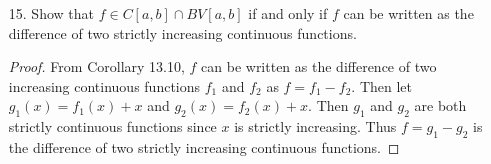 \documentclass{article}
\begin{document}
\begin{itemize}
\begin{proof}
			We have equality
			\begin{align*}
				\abs{\sum_{n=1}^{\infty} c_n\bigg[I(y_i-x_n)-I(y_{i-1}-x_n)\bigg]} = \sum_{n=1}^{\infty} \abs{c_n\bigg[I(y_i-x_n)-I(y_{i-1}-x_n)\bigg]}
			\end{align*}
			if and only if all of the $c_n\bigg[I(y_i-x_n)-I(y_{i-1}-x_n)\bigg]$ have the same sign, which can happen if
			\begin{align*}
				I(y_i-x_n)-I(y_{i-1}-x_n)=\begin{cases}
					0 &\text{if }c_n<0 \\
					1 &\text{if }c_n\ge 0
				\end{cases}
			\end{align*}
			This construction is relatively easy to do, and produces equality of $V(f, P)=\sum_{n=1}^{\infty} \abs{c_n},$ so since $V_a^b f\ge V(f, P)$ for all $P,$ we have $V_a^b f= \sum_{n=1}^{\infty} \abs{c_n}.$
		\end{proof}

	\item[15.] Show that $f\in C[a, b]\cap BV[a, b]$ if and only if $f$ can be written as the difference of two strictly increasing continuous functions.
		\begin{proof}
			From Corollary 13.10, $f$ can be written as the difference of two increasing continuous functions $f_1$ and $f_2$ as $f=f_1-f_2.$ Then let $g_1(x)=f_1(x)+x$ and $g_2(x)=f_2(x)+x.$ Then $g_1$ and $g_2$ are both strictly continuous functions since $x$ is strictly increasing. Thus $f=g_1-g_2$ is the difference of two strictly increasing continuous functions.
		\end{proof}
		
\end{itemize}
\end{document}
